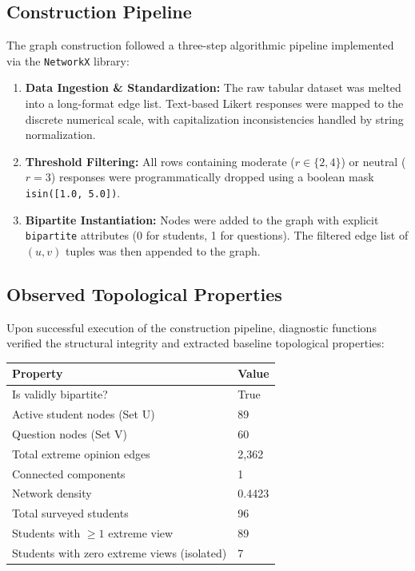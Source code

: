 \documentclass[11pt, a4paper]{article}
\begin{document}
\subsection{Construction Pipeline}

The graph construction followed a three-step algorithmic pipeline implemented via the \texttt{NetworkX} library:

\begin{enumerate}
    \item \textbf{Data Ingestion \& Standardization:} The raw tabular dataset was melted into a long-format edge list. Text-based Likert responses were mapped to the discrete numerical scale, with capitalization inconsistencies handled by string normalization.
    \item \textbf{Threshold Filtering:} All rows containing moderate ($r \in \{2, 4\}$) or neutral ($r = 3$) responses were programmatically dropped using a boolean mask \texttt{isin([1.0, 5.0])}.
    \item \textbf{Bipartite Instantiation:} Nodes were added to the graph with explicit \texttt{bipartite} attributes (0 for students, 1 for questions). The filtered edge list of $(u, v)$ tuples was then appended to the graph.
\end{enumerate}

\subsection{Observed Topological Properties}

Upon successful execution of the construction pipeline, diagnostic functions verified the structural integrity and extracted baseline topological properties:

\begin{center}
\begin{tabular}{ll}
\toprule
\textbf{Property} & \textbf{Value} \\
\midrule
Is validly bipartite? & True \\
Active student nodes (Set U) & 89 \\
Question nodes (Set V) & 60 \\
Total extreme opinion edges & 2,362 \\
Connected components & 1 \\
Network density & 0.4423 \\
Total surveyed students & 96 \\
Students with $\geq 1$ extreme view & 89 \\
Students with zero extreme views (isolated) & 7 \\
\bottomrule
\end{tabular}
\end{center}
\end{document}
